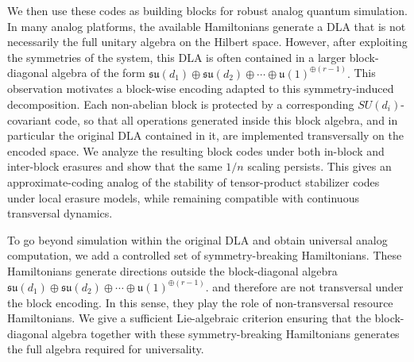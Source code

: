 \documentclass[10pt,twocolumn,superscriptaddress,aps,amsmath,amssymb,citeautoscript,floatfix,prx,longbibliography]{revtex4-2}
\newcounter{alg}
\theoremstyle{plain}
\theoremstyle{plain}
\theoremstyle{plain}
\theoremstyle{plain}
\theoremstyle{plain}
\theoremstyle{plain}
\begin{document}
We then use these codes as building blocks for robust analog quantum simulation. In many analog platforms, the available Hamiltonians generate a DLA that is not necessarily the full unitary algebra on the Hilbert space. However, after exploiting the symmetries of the system, this DLA is often contained in a larger block-diagonal algebra of the form
$
    \mathfrak{su}(d_1)\oplus\mathfrak{su}(d_2)\oplus\cdots
    \oplus \mathfrak{u}(1)^{\oplus(r-1)}.
$
This observation motivates a block-wise encoding adapted to this symmetry-induced decomposition. Each non-abelian block is protected by a corresponding \(SU(d_i)\)-covariant code, so that all operations generated inside this block algebra, and in particular the original DLA contained in it, are implemented transversally on the encoded space. We analyze the resulting block
codes under both in-block and inter-block erasures and show that the same \(1/n\) scaling persists. This gives an approximate-coding analog of the stability of tensor-product stabilizer codes under local erasure models, while remaining compatible with continuous transversal dynamics.

To go beyond simulation within the original DLA and obtain universal analog computation, we add a controlled set of symmetry-breaking Hamiltonians. These Hamiltonians generate directions outside the block-diagonal algebra
$
    \mathfrak{su}(d_1)\oplus\mathfrak{su}(d_2)\oplus\cdots
    \oplus \mathfrak{u}(1)^{\oplus(r-1)}.
$
and therefore are not transversal under the block encoding. In this sense, they play the role of non-transversal resource Hamiltonians. We give a sufficient Lie-algebraic criterion ensuring that the block-diagonal algebra together with these symmetry-breaking Hamiltonians generates the full algebra required for universality.
\end{document}
